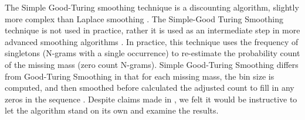\documentclass[ai15_group61_report.tex]{subfiles}
\begin{document}
The Simple Good-Turing smoothing technique is a discounting algorithm, slightly more complex than Laplace smoothing \cite{Jurafsky2000}. The Simple-Good Turing Smoothing technique is not used in practice, rather it is used as an intermediate step in more advanced smoothing algorithms \cite{chen-smoothing}. In practice, this technique uses the frequency of singletons (N-grams with a single occurrence) to re-estimate the probability count of the missing mass (zero count N-grams). Simple Good-Turing Smoothing differs from Good-Turing Smoothing in that for each missing mass, the bin size is computed, and then smoothed before calculated the adjusted count to fill in any zeros in the sequence \cite{Jurafsky2000}. Despite claims made in \citep{chen-smoothing}, we felt it would be instructive to let the algorithm stand on its own and examine the results.  
\end{document}
